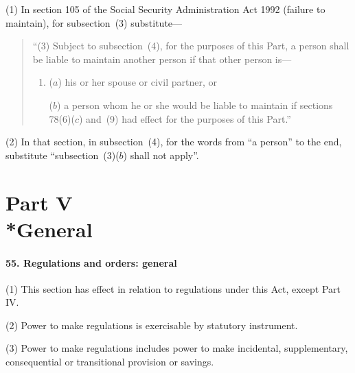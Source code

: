 \documentclass[12pt,a4paper]{article}
\begin{document}
(1) In section 105 of the Social Security Administration Act 1992 (failure to maintain), for subsection~(3) substitute—
\begin{quotation}
“(3) Subject to subsection~(4), for the purposes of this Part, a person shall be liable to maintain another person if that other person is—
\begin{enumerate}\item[]
($a$) his or her spouse or civil partner, or

($b$) a person whom he or she would be liable to maintain if sections 78(6)($c$) and~(9) had effect for the purposes of this Part.”
\end{enumerate}
\end{quotation}

(2) In that section, in subsection~(4), for the words from “a person” to the end, substitute “subsection~(3)($b$) shall not apply”.



\part[Part V --- General]{Part V\\*General}

\renewcommand\parthead{--- Part V}

\subsection{55. Regulations and orders: general}

(1) This section has effect in relation to regulations under this Act, except Part IV.

(2) Power to make regulations is exercisable by statutory instrument.

(3) Power to make regulations includes power to make incidental, supplementary, consequential or transitional provision or savings.
\end{document}
